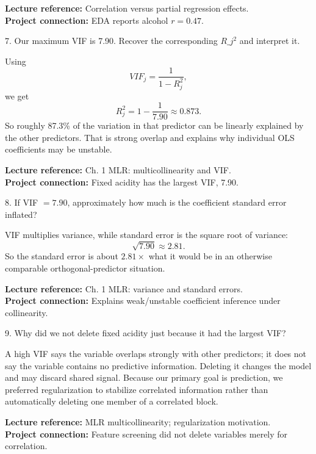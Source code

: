 \documentclass[10.5pt,a4paper]{article}
\newcommand{\chapref}[1]{\textbf{Lecture reference:} #1}
\newcommand{\projectref}[1]{\textbf{Project connection:} #1}
\begin{document}
\begin{refbox}\chapref{Correlation versus partial regression effects.}\\\projectref{EDA reports alcohol $r=0.47$.}\end{refbox}
\begin{qbox}{7. Our maximum VIF is 7.90. Recover the corresponding $R\_j^2$ and interpret it.}
\end{qbox}
\begin{answerbox}Using
\[
VIF_j=\frac{1}{1-R_j^2},
\]
we get
\[
R_j^2=1-\frac{1}{7.90}\approx0.873.
\]
So roughly 87.3\% of the variation in that predictor can be linearly explained by the other predictors. That is strong overlap and explains why individual OLS coefficients may be unstable.\end{answerbox}
\begin{refbox}\chapref{Ch. 1 MLR: multicollinearity and VIF.}\\\projectref{Fixed acidity has the largest VIF, 7.90.}\end{refbox}
\begin{qbox}{8. If VIF $=7.90$, approximately how much is the coefficient standard error inflated?}
\end{qbox}
\begin{answerbox}VIF multiplies variance, while standard error is the square root of variance:
\[
\sqrt{7.90}\approx2.81.
\]
So the standard error is about \(2.81\times\) what it would be in an otherwise comparable orthogonal-predictor situation.\end{answerbox}
\begin{refbox}\chapref{Ch. 1 MLR: variance and standard errors.}\\\projectref{Explains weak/unstable coefficient inference under collinearity.}\end{refbox}
\begin{qbox}{9. Why did we not delete fixed acidity just because it had the largest VIF?}
\end{qbox}
\begin{answerbox}A high VIF says the variable overlaps strongly with other predictors; it does not say the variable contains no predictive information. Deleting it changes the model and may discard shared signal. Because our primary goal is prediction, we preferred regularization to stabilize correlated information rather than automatically deleting one member of a correlated block.\end{answerbox}
\begin{refbox}\chapref{MLR multicollinearity; regularization motivation.}\\\projectref{Feature screening did not delete variables merely for correlation.}\end{refbox}
\end{document}
